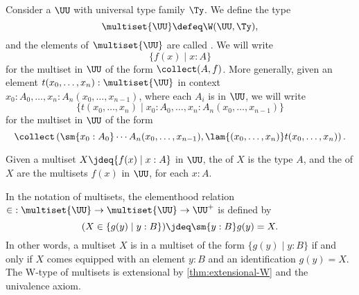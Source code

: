 \begin{defn}
  Consider a $\UU$ with universal type family $\Ty$. We define the type
  \begin{equation*}
    \multiset{\UU} \defeq \W(\UU,\Ty),
  \end{equation*}
  and the elements of $\multiset{\UU}$ are called . We will write
  \begin{equation*}
    \{f(x)\mid x:A\}
  \end{equation*}
  for the multiset in $\UU$ of the form $\collect(A,f)$. More generally, given an element $t(x_0,\ldots,x_n):\multiset{\UU}$ in context $x_0:A_0,\ldots,x_n:A_n(x_0,\ldots,x_{n-1})$, where each $A_i$ is in $\UU$, we will write
  \begin{equation*}
    \{t(x_0,\ldots,x_n)\mid x_0:A_0,\ldots,x_n:A_n(x_0,\ldots,x_{n-1})\}
  \end{equation*}
  for the multiset in $\UU$ of the form
  \begin{equation*}
    \collect\left(\sm{x_0:A_0}\cdots A_n(x_0,\ldots,x_{n-1}),\lam{(x_0,\ldots,x_n)}t(x_0,\ldots,x_n)\right).
  \end{equation*}

  Given a multiset $X\jdeq \{f(x)\mid x:A\}$ in $\UU$, the  of $X$ is the type $A$, and the  of $X$ are the multisets $f(x)$ in $\UU$, for each $x:A$.
\end{defn}

In the notation of multisets, the elementhood relation ${\in}:\multiset{\UU}\to\multiset{\UU} \to\UU^+$ is defined by
\begin{equation*}
  (X\in \{g(y)\mid y:B\}) \jdeq \sm{y:B} g(y)=X.
\end{equation*}
In other words, a multiset $X$ is in a multiset of the form $\{g(y)\mid y:B\}$ if and only if $X$ comes equipped with an element $y:B$ and an identification $g(y)=X$. The W-type of multisets is extensional by \cref{thm:extensional-W} and the univalence axiom.

